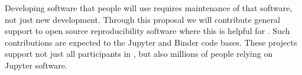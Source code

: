 \begin{task}[
  title=Maintenance of open source reproducibility software,
  id=maintenance,
  lead=SRL,
  PM=6,
  partners={QS}
]

Developing software that people will use requires maintenance of that
software, not just new development. Through this proposal we will
contribute general support to open source reproducibility software
where this is helpful for \TheProject. Such contributions are expected
to the Jupyter and Binder code bases.
These projects support not just all participants in \TheProject,
but also millions of people relying on Jupyter software.


%
%
%
%

\end{task}
